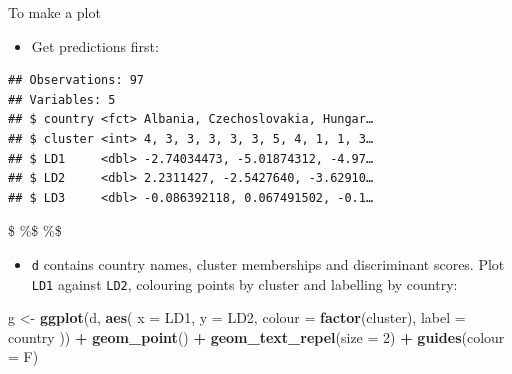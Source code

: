 \documentclass[ignorenonframetext,]{beamer}
\newenvironment{Shaded}{\begin{snugshade}}{\end{snugshade}}
\newcommand{\DataTypeTok}[1]{\textcolor[rgb]{0.13,0.29,0.53}{#1}}
\newcommand{\DecValTok}[1]{\textcolor[rgb]{0.00,0.00,0.81}{#1}}
\newcommand{\KeywordTok}[1]{\textcolor[rgb]{0.13,0.29,0.53}{\textbf{#1}}}
\newcommand{\NormalTok}[1]{#1}
\newcommand{\OperatorTok}[1]{\textcolor[rgb]{0.81,0.36,0.00}{\textbf{#1}}}
\newcommand{\StringTok}[1]{\textcolor[rgb]{0.31,0.60,0.02}{#1}}
\providecommand{\tightlist}{%
  \setlength{\itemsep}{0pt}\setlength{\parskip}{0pt}}
\begin{document}
\begin{frame}[fragile]{To make a plot}
\protect\hypertarget{to-make-a-plot}{}

\begin{itemize}
\tightlist
\item
  Get predictions first:
\end{itemize}

\begin{Shaded}
\end{Shaded}

\begin{verbatim}
## Observations: 97
## Variables: 5
## $ country <fct> Albania, Czechoslovakia, Hungar…
## $ cluster <int> 4, 3, 3, 3, 3, 3, 5, 4, 1, 1, 3…
## $ LD1     <dbl> -2.74034473, -5.01874312, -4.97…
## $ LD2     <dbl> 2.2311427, -2.5427640, -3.62910…
## $ LD3     <dbl> -0.086392118, 0.067491502, -0.1…
\end{verbatim}

\$ \%\$ \%\$

\begin{itemize}
\tightlist
\item
  \texttt{d} contains country names, cluster memberships and
  discriminant scores. Plot \texttt{LD1} against \texttt{LD2}, colouring
  points by cluster and labelling by country:
\end{itemize}

\begin{Shaded}
\begin{Highlighting}[]
\NormalTok{g <-}\StringTok{ }\KeywordTok{ggplot}\NormalTok{(d, }\KeywordTok{aes}\NormalTok{(}
  \DataTypeTok{x =}\NormalTok{ LD1, }\DataTypeTok{y =}\NormalTok{ LD2, }\DataTypeTok{colour =} \KeywordTok{factor}\NormalTok{(cluster),}
  \DataTypeTok{label =}\NormalTok{ country}
\NormalTok{)) }\OperatorTok{+}\StringTok{ }\KeywordTok{geom_point}\NormalTok{() }\OperatorTok{+}
\StringTok{  }\KeywordTok{geom_text_repel}\NormalTok{(}\DataTypeTok{size =} \DecValTok{2}\NormalTok{) }\OperatorTok{+}\StringTok{ }\KeywordTok{guides}\NormalTok{(}\DataTypeTok{colour =}\NormalTok{ F)}
\end{Highlighting}
\end{Shaded}

\end{frame}
\end{document}
